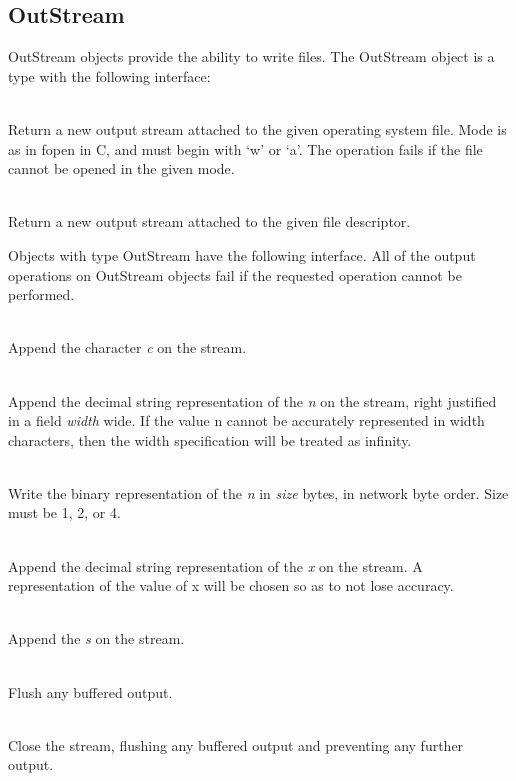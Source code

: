 \subsection{OutStream}
\label{builtin outstream}
OutStream objects provide the ability to write files.  The OutStream object
is a type with the following interface:

\begin{desc}
  \item[\kw{operation} toUnix\/\LB{}fn \CO{} \tn{String}, mode \CO{} \tn{String}\/\RB{} \returns{} \/\LB{}OutStream\/\RB{}]~\\
    Return a new output stream attached to the given operating system file.
    Mode is as in fopen in C, and must begin with `w' or `a'.
    The operation fails if the file cannot be opened in the given mode.
  \item[\kw{operation} create\/\LB{}file \CO{} \tn{Integer}\/\RB{} \returns{} \/\LB{}OutStream\/\RB{}]~\\
    Return a new output stream attached to the given file descriptor.
\end{desc}

\noindent Objects with type OutStream have the following interface.
All of the output operations on OutStream objects fail if the requested
operation cannot be performed.

\begin{desc}
  \item[\kw{operation} putChar\/\LB{}c \CO{} \tn{Character}\/\RB{}]~\\
    Append the character {\it c} on the stream.
  \item[\kw{operation} putInt\/\LB{}n \CO{} \tn{Integer}, width \CO{} \tn{Integer}\/\RB{}]~\\
    Append the decimal string representation of the  {\it n} on the
    stream, right justified in a field {\it width} wide.  If the value n
    cannot be accurately represented in width characters, then the width
    specification will be treated as infinity.
  \item[\kw{operation} writeInt\/\LB{}n \CO{} \tn{Integer}, size \CO{} \tn{Integer}\/\RB{}]~\\
    Write the binary representation of the  {\it n} in {\it
    size} bytes, in network byte order.  Size must be 1, 2, or 4.
  \item[\kw{operation} putReal\/\LB{}x \CO{} \tn{Real}\/\RB{}]~\\
    Append the decimal string representation of the  {\it x} on the
    stream.  A representation of the value of x will be chosen so as to not
    lose accuracy.
  \item[\kw{operation} putString\/\LB{}s \CO{} \tn{String}\/\RB{}]~\\
    Append the  {\it s} on the stream.
  \item[\kw{operation} flush]~\\
    Flush any buffered output.
  \item[\kw{operation} close]~\\
    Close the stream, flushing any buffered output and preventing any
    further output.
\end{desc}

